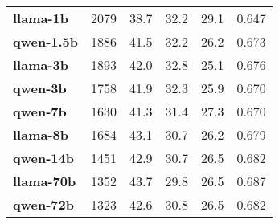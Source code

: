 \begin{table}[t]
{\begin{tabular}{lccccc}
\textbf{llama-1b} & 2079 & 38.7 & 32.2 & 29.1 & 0.647\\

\textbf{qwen-1.5b} & 1886 & 41.5 & 32.2 & 26.2 & 0.673\\

\textbf{llama-3b} & 1893 & 42.0 & 32.8 & 25.1 & 0.676\\

\textbf{qwen-3b} & 1758 & 41.9 & 32.3 & 25.9 & 0.670\\

\textbf{qwen-7b} & 1630 & 41.3 & 31.4 & 27.3 & 0.670\\

\textbf{llama-8b} & 1684 & 43.1 & 30.7 & 26.2 & 0.679\\

\textbf{qwen-14b} & 1451 & 42.9 & 30.7 & 26.5 & 0.682\\

\textbf{llama-70b} & 1352 & 43.7 & 29.8 & 26.5 & 0.687\\

\textbf{qwen-72b} & 1323 & 42.6 & 30.8 & 26.5 & 0.682\\

\bottomrule
\end{tabular}
}
\label{tab:rq2}
\end{table}